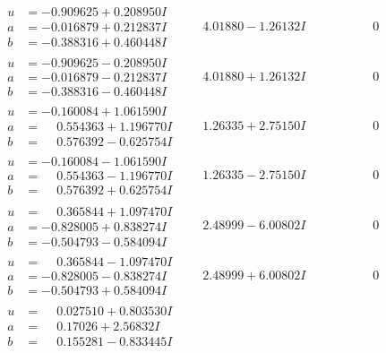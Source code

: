 \documentclass[1p]{elsarticle_modified}
\theoremstyle{definition}
\begin{document}
$$\begin{array}{c|c|c}
\begin{aligned}
u &= -0.909625 + 0.208950 I \\
a &= -0.016879 + 0.212837 I \\
b &= -0.388316 + 0.460448 I\end{aligned}
 & \phantom{-}4.01880 - 1.26132 I & \phantom{-0.000000 } 0 \\ \hline\begin{aligned}
u &= -0.909625 - 0.208950 I \\
a &= -0.016879 - 0.212837 I \\
b &= -0.388316 - 0.460448 I\end{aligned}
 & \phantom{-}4.01880 + 1.26132 I & \phantom{-0.000000 } 0 \\ \hline\begin{aligned}
u &= -0.160084 + 1.061590 I \\
a &= \phantom{-}0.554363 + 1.196770 I \\
b &= \phantom{-}0.576392 - 0.625754 I\end{aligned}
 & \phantom{-}1.26335 + 2.75150 I & \phantom{-0.000000 } 0 \\ \hline\begin{aligned}
u &= -0.160084 - 1.061590 I \\
a &= \phantom{-}0.554363 - 1.196770 I \\
b &= \phantom{-}0.576392 + 0.625754 I\end{aligned}
 & \phantom{-}1.26335 - 2.75150 I & \phantom{-0.000000 } 0 \\ \hline\begin{aligned}
u &= \phantom{-}0.365844 + 1.097470 I \\
a &= -0.828005 + 0.838274 I \\
b &= -0.504793 - 0.584094 I\end{aligned}
 & \phantom{-}2.48999 - 6.00802 I & \phantom{-0.000000 } 0 \\ \hline\begin{aligned}
u &= \phantom{-}0.365844 - 1.097470 I \\
a &= -0.828005 - 0.838274 I \\
b &= -0.504793 + 0.584094 I\end{aligned}
 & \phantom{-}2.48999 + 6.00802 I & \phantom{-0.000000 } 0 \\ \hline\begin{aligned}
u &= \phantom{-}0.027510 + 0.803530 I \\
a &= \phantom{-}0.17026 + 2.56832 I \\
b &= \phantom{-}0.155281 - 0.833445 I\end{aligned}

\end{array}$$
\end{document}
